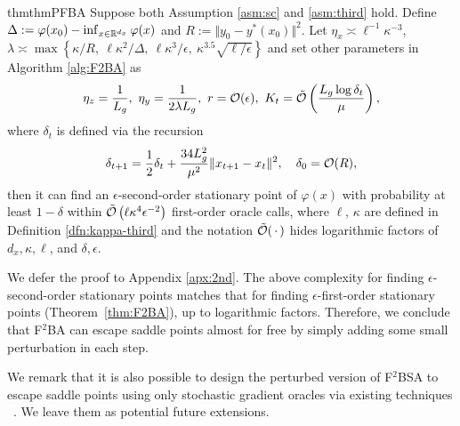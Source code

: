 \documentclass[twoside,11pt]{article}
\begin{document}
\begin{restatable}{thm}{thmPFBA}\label{thm:PF2BA}
Suppose both Assumption \ref{asm:sc} and \ref{asm:third} hold.
Define $\Delta:=\varphi(x_0) - \inf_{x \in {\mathbb{R}}^{d_x}} \varphi(x)$ and $R := \Vert y_0 - y^*(x_0) \Vert^2 $.
Let $\eta_x \asymp \ell^{-1} \kappa^{-3} $, $\lambda \asymp \max\left\{ \kappa/R,~\ell \kappa^2/ \Delta, ~ \ell \kappa^3 / \epsilon,~\kappa^{3.5} \sqrt{\ell / \epsilon} \right\} $ and set other parameters 
in Algorithm \ref{alg:F2BA} as 
\begin{align*}
    \eta_z = \frac{1}{L_g}, ~ \eta_y = \frac{1}{2 \lambda L_g}, ~r = {\mathcal{O}}(\epsilon),  ~ K_t = \tilde {{\mathcal{O}}}\left(\frac{L_g  \log \delta_t}{\mu}   \right),
\end{align*}
where $\delta_t$ is defined via the recursion
\begin{align} \label{eq:delta-t}
    \delta_{t+1} = \frac{1}{2}\delta_t + \frac{34 L_g^2}{\mu^2}  \Vert x_{t+1} - x_t \Vert^2, \quad \delta_0 = {\mathcal{O}}(R),
\end{align}
then 
it can find an $\epsilon$-second-order stationary point of $\varphi(x)$ with probability at least $1-\delta$
within $\tilde {{\mathcal{O}}}\left(\ell \kappa^4 \epsilon^{-2} \right) $ first-order oracle calls, where $\ell$,  $\kappa$ are defined in Definition \ref{dfn:kappa-third} and the notation $\tilde {{\mathcal{O}}}(\,\cdot\,)$ hides logarithmic factors of $d_x,\kappa,\ell$, and $\delta,\epsilon$.
\end{restatable}
We defer the proof to Appendix \ref{apx:2nd}.
The above complexity 
for finding $\epsilon$-second-order stationary points matches that  
for finding $\epsilon$-first-order stationary points (Theorem~\ref{thm:F2BA}), up to logarithmic factors. Therefore, we conclude that F${}^2$BA 
can escape saddle points almost for free by simply adding some small perturbation in each step.

{
We remark that it is also possible to design the perturbed version of F${}^2$BSA to escape saddle points using only stochastic gradient oracles via existing techniques ~\citep{xu2018first,allen2018neon2}. We leave them as potential future extensions.}
\end{document}
